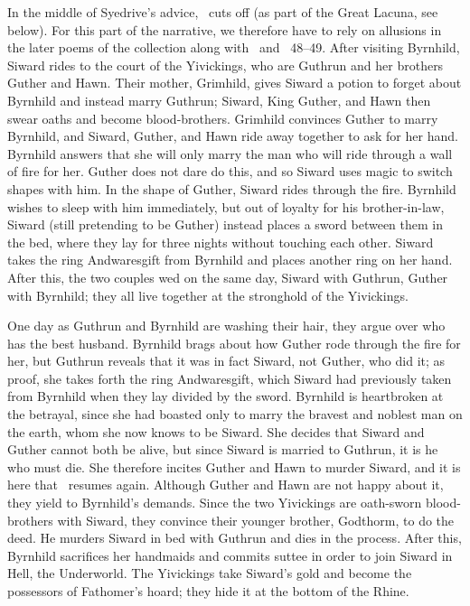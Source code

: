 In the middle of Syedrive’s advice, \Regius\ cuts off (as part of the Great Lacuna, see below).  For this part of the narrative, we therefore have to rely on allusions in the later poems of the collection along with \VolsungaSaga\ and \Skaldskaparmal\ 48--49.  After visiting Byrnhild, Siward rides to the court of the Yivickings, who are Guthrun and her brothers Guther and Hawn.  Their mother, Grimhild, gives Siward a potion to forget about Byrnhild and instead marry Guthrun; Siward, King Guther, and Hawn then swear oaths and become blood-brothers.  Grimhild convinces Guther to marry Byrnhild, and Siward, Guther, and Hawn ride away together to ask for her hand.  Byrnhild answers that she will only marry the man who will ride through a wall of fire for her.  Guther does not dare do this, and so Siward uses magic to switch shapes with him.  In the shape of Guther, Siward rides through the fire.  Byrnhild wishes to sleep with him immediately, but out of loyalty for his brother-in-law, Siward (still pretending to be Guther) instead places a sword between them in the bed, where they lay for three nights without touching each other.  Siward takes the ring Andwaresgift from Byrnhild and places another ring on her hand.  After this, the two couples wed on the same day, Siward with Guthrun, Guther with Byrnhild; they all live together at the stronghold of the Yivickings.

One day as Guthrun and Byrnhild are washing their hair, they argue over who has the best husband.  Byrnhild brags about how Guther rode through the fire for her, but Guthrun reveals that it was in fact Siward, not Guther, who did it; as proof, she takes forth the ring Andwaresgift, which Siward had previously taken from Byrnhild when they lay divided by the sword.  Byrnhild is heartbroken at the betrayal, since she had boasted only to marry the bravest and noblest man on the earth, whom she now knows to be Siward.  She decides that Siward and Guther cannot both be alive, but since Siward is married to Guthrun, it is he who must die.  She therefore incites Guther and Hawn to murder Siward, and it is here that \Regius\ resumes again.
Although Guther and Hawn are not happy about it, they yield to Byrnhild’s demands.  Since the two Yivickings are oath-sworn blood-brothers with Siward, they convince their younger brother, Godthorm, to do the deed.  He murders Siward in bed with Guthrun and dies in the process.  After this, Byrnhild sacrifices her handmaids and commits suttee in order to join Siward in Hell, the Underworld.  The Yivickings take Siward’s gold and become the possessors of Fathomer’s hoard; they hide it at the bottom of the Rhine.

